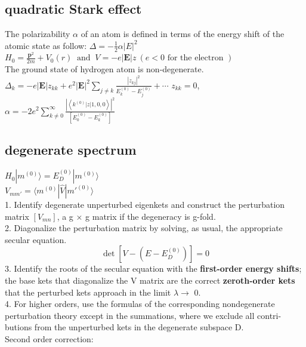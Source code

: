 \documentclass[10pt, oneside]{article}   	%
\begin{document}
\begin{multicols}{2}
\subsection{quadratic Stark effect}
The polarizability $\alpha$ of an atom is defined in terms of the energy shift of the atomic state as follow:
$\Delta=-\frac{1}{2}\alpha|E|^2$\\
$H_{0}=\frac{\mathbf{p}^{2}}{2 m}+V_{0}(r) \: \text { and } \: V=-e|\mathbf{E}| z \:(e<0 \text { for the electron })$\\
The ground state of hydrogen atom is non-degenerate.\\
$\Delta_{k}=-e|\mathbf{E}| z_{k k}+e^{2}|\mathbf{E}|^{2} \sum_{j \neq k} \frac{\left|z_{k j}\right|^{2}}{E_{k}^{(0)}-E_{j}^{(0)}}+\cdots$
$z_{kk}=0$,
$\alpha=-2 e^{2} \sum\limits_{k \neq 0}^{\infty} \frac{\left|\left\langle k^{(0)}|z| 1,0,0\right\rangle\right|^{2}}{\left[E_{0}^{(0)}-E_{k}^{(0)}\right]}$
\subsection{degenerate spectrum}
$H_0|m^{(0)}\rangle=E_D^{(0)}|m^{(0)}\rangle$\\
$V_{m m'}=\langle m^{(0)} | \hat{V} |m'^{(0)}\rangle$\\
1. Identify degenerate unperturbed eigenkets and construct the perturbation matrix $[V_{mn}]$, a g × g matrix if the degeneracy is g-fold.\\
2. Diagonalize the perturbation matrix by solving, as usual, the appropriate secular equation.\\
$$\operatorname{det}\left[V-\left(E-E_{D}^{(0)}\right)\right]=0$$
3. Identify the roots of the secular equation with the \textbf{first-order energy shifts}; the base kets that diagonalize the V matrix are the correct \textbf{zeroth-order kets} that the perturbed kets approach in the limit  $\lambda\rightarrow$ 0.\\
4. For higher orders, use the formulas of the corresponding nondegenerate perturbation theory except in the summations, where we exclude all contri- butions from the unperturbed kets in the degenerate subspace D.\\
Second order correction:

\end{multicols}
\end{document}
